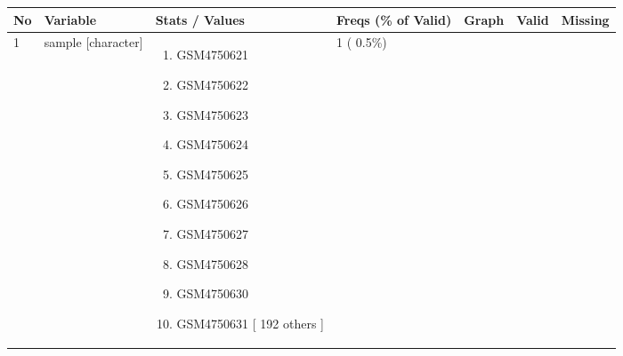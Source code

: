 \documentclass[
]{article}
\providecommand{\tightlist}{%
  \setlength{\itemsep}{0pt}\setlength{\parskip}{0pt}}
\begin{document}
\begin{longtable}[]{@{}lllllll@{}}
\toprule
\begin{minipage}[b]{0.03\columnwidth}\raggedright
No\strut
\end{minipage} & \begin{minipage}[b]{0.16\columnwidth}\raggedright
Variable\strut
\end{minipage} & \begin{minipage}[b]{0.20\columnwidth}\raggedright
Stats / Values\strut
\end{minipage} & \begin{minipage}[b]{0.14\columnwidth}\raggedright
Freqs (\% of Valid)\strut
\end{minipage} & \begin{minipage}[b]{0.14\columnwidth}\raggedright
Graph\strut
\end{minipage} & \begin{minipage}[b]{0.07\columnwidth}\raggedright
Valid\strut
\end{minipage} & \begin{minipage}[b]{0.07\columnwidth}\raggedright
Missing\strut
\end{minipage}\tabularnewline
\midrule
\endhead
\begin{minipage}[t]{0.03\columnwidth}\raggedright
1\strut
\end{minipage} & \begin{minipage}[t]{0.16\columnwidth}\raggedright
sample
{[}character{]}\strut
\end{minipage} & \begin{minipage}[t]{0.20\columnwidth}\raggedright
\begin{enumerate}
\def\labelenumi{\arabic{enumi}.}
\tightlist
\item
  GSM4750621
\item
  GSM4750622
\item
  GSM4750623
\item
  GSM4750624
\item
  GSM4750625
\item
  GSM4750626
\item
  GSM4750627
\item
  GSM4750628
\item
  GSM4750630
\item
  GSM4750631
  {[} 192 others {]}
\end{enumerate}\strut
\end{minipage} & \begin{minipage}[t]{0.14\columnwidth}\raggedright
1 ( 0.5\%)

\end{minipage}
\end{longtable}
\end{document}
